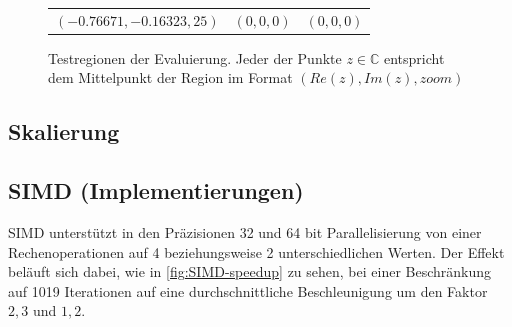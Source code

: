 \begin{figure}
\begin{tabular}{ccc}
		\( (-0.76671,-0.16323,25) \)                               & \( (0,0,0) \)                                                 & \( (0,0,0) \)                                             \\
	\end{tabular}
	\caption{Testregionen der Evaluierung. Jeder der Punkte \( z \in \mathbb{C} \) entspricht dem Mittelpunkt der Region im Format \( (Re(z), Im(z), zoom) \) }
	\label{fig:testRegions}
\end{figure}



\subsection{Skalierung}





\subsection{SIMD (Implementierungen)}




SIMD unterstützt in den Präzisionen 32 und 64 bit Parallelisierung von einer Rechenoperationen auf
4 beziehungsweise 2 unterschiedlichen Werten. Der Effekt beläuft sich dabei, wie in \autoref{fig:SIMD-speedup} zu sehen,
bei einer Beschränkung auf 1019 Iterationen auf eine durchschnittliche Beschleunigung um den Faktor $2,3$ und $1,2$.

